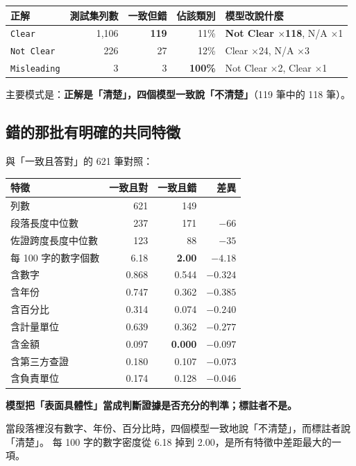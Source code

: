 \documentclass[11pt,a4paper]{ctexart}
\newcommand{\fn}[1]{\texttt{#1}}
\begin{document}
\begin{table}[h]
\centering\small
\begin{tabular}{@{}lrrrl@{}}
\toprule
正解 & 測試集列數 & 一致但錯 & 佔該類別 & 模型改說什麼 \\
\midrule
\rowcolor{yellow!12}
\fn{Clear} & 1{,}106 & \textbf{119} & 11\% & \textbf{Not Clear $\times$118}, N/A $\times$1 \\
\fn{Not Clear} & 226 & 27 & 12\% & Clear $\times$24, N/A $\times$3 \\
\fn{Misleading} & 3 & 3 & \textbf{100\%} & Not Clear $\times$2, Clear $\times$1 \\
\bottomrule
\end{tabular}
\end{table}

主要模式是：\textbf{正解是「清楚」，四個模型一致說「不清楚」}（119 筆中的 118 筆）。

\subsection{錯的那批有明確的共同特徵}

與「一致且答對」的 621 筆對照：

\begin{table}[h]
\centering\small
\begin{tabular}{@{}lrrr@{}}
\toprule
特徵 & 一致且對 & 一致且錯 & 差異 \\
\midrule
列數 & 621 & 149 & \\
段落長度中位數 & 237 & 171 & $-66$ \\
佐證跨度長度中位數 & 123 & 88 & $-35$ \\
\rowcolor{yellow!15}
每 100 字的數字個數 & 6.18 & \textbf{2.00} & $\mathbf{-4.18}$ \\
含數字 & 0.868 & 0.544 & $-0.324$ \\
含年份 & 0.747 & 0.362 & $-0.385$ \\
含百分比 & 0.314 & 0.074 & $-0.240$ \\
含計量單位 & 0.639 & 0.362 & $-0.277$ \\
含金額 & 0.097 & \textbf{0.000} & $-0.097$ \\
含第三方查證 & 0.180 & 0.107 & $-0.073$ \\
含負責單位 & 0.174 & 0.128 & $-0.046$ \\
\bottomrule
\end{tabular}
\end{table}

\begin{tcolorbox}[colback=blue!5, colframe=blue!55, title=本支線的核心發現]
\textbf{模型把「表面具體性」當成判斷證據是否充分的判準；標註者不是。}

\medskip
當段落裡沒有數字、年份、百分比時，四個模型一致地說「不清楚」，而標註者說「清楚」。
每 100 字的數字密度從 6.18 掉到 2.00，是所有特徵中差距最大的一項。
\end{tcolorbox}
\end{document}

